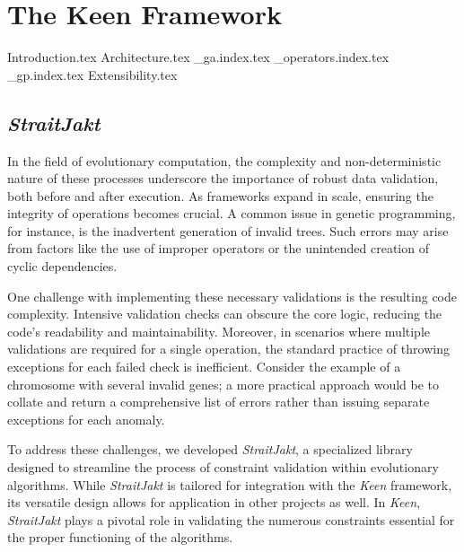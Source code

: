 
\chapter{The Keen Framework}
\label{chap:keen}
    {Introduction.tex}
    {Architecture.tex}
    {_ga.index.tex}
    {_operators.index.tex}
    {_gp.index.tex}
    {Extensibility.tex}

    \section{\textit{StraitJakt}}
        In the field of evolutionary computation, the complexity and non-deterministic nature of these processes 
        underscore the importance of robust data validation, both before and after execution. As frameworks expand in 
        scale, ensuring the integrity of operations becomes crucial. A common issue in genetic programming, for 
        instance, is the inadvertent generation of invalid trees. Such errors may arise from factors like the use of 
        improper operators or the unintended creation of cyclic dependencies.

        One challenge with implementing these necessary validations is the resulting code complexity. Intensive 
        validation checks can obscure the core logic, reducing the code's readability and maintainability. Moreover, in 
        scenarios where multiple validations are required for a single operation, the standard practice of throwing 
        exceptions for each failed check is inefficient. Consider the example of a chromosome with several invalid 
        genes; a more practical approach would be to collate and return a comprehensive list of errors rather than 
        issuing separate exceptions for each anomaly.

        To address these challenges, we developed \textit{StraitJakt}, a specialized library designed to streamline the 
        process of constraint validation within evolutionary algorithms. While \textit{StraitJakt} is tailored for 
        integration with the \textit{Keen} framework, its versatile design allows for application in other projects as 
        well. In \textit{Keen}, \textit{StraitJakt} plays a pivotal role in validating the numerous constraints 
        essential for the proper functioning of the algorithms.

